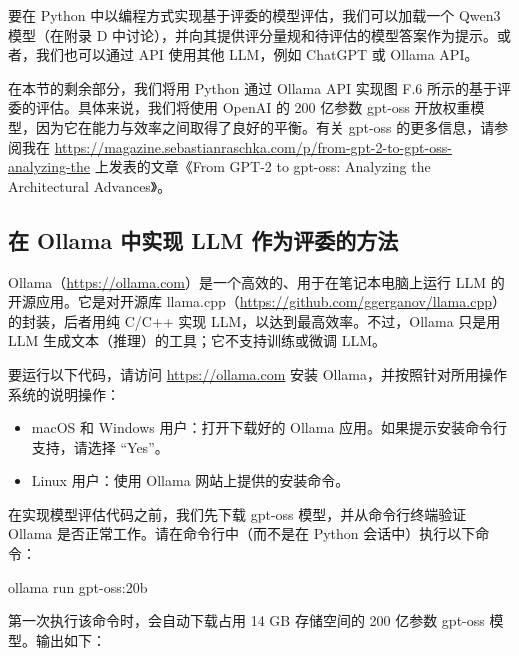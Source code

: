 要在 Python 中以编程方式实现基于评委的模型评估，我们可以加载一个 Qwen3 模型（在附录 D 中讨论），并向其提供评分量规和待评估的模型答案作为提示。或者，我们也可以通过 API 使用其他 LLM，例如 ChatGPT 或 Ollama API。

在本节的剩余部分，我们将用 Python 通过 Ollama API 实现图 F.6 所示的基于评委的评估。具体来说，我们将使用 OpenAI 的 200 亿参数 gpt-oss 开放权重模型，因为它在能力与效率之间取得了良好的平衡。有关 gpt-oss 的更多信息，请参阅我在 \href{https://magazine.sebastianraschka.com/p/from-gpt-2-to-gpt-oss-analyzing-the}{https://magazine.sebastianraschka.com/p/from-gpt-2-to-gpt-oss-analyzing-the} 上发表的文章《From GPT-2 to gpt-oss: Analyzing the Architectural Advances》。

\subsection{在 Ollama 中实现 LLM 作为评委的方法}

Ollama（\href{https://ollama.com}{https://ollama.com}）是一个高效的、用于在笔记本电脑上运行 LLM 的开源应用。它是对开源库 llama.cpp（\href{https://github.com/ggerganov/llama.cpp}{https://github.com/ggerganov/llama.cpp}）的封装，后者用纯 C/C++ 实现 LLM，以达到最高效率。不过，Ollama 只是用 LLM 生成文本（推理）的工具；它不支持训练或微调 LLM。

要运行以下代码，请访问 \href{https://ollama.com}{https://ollama.com} 安装 Ollama，并按照针对所用操作系统的说明操作：

\begin{itemize}
\item macOS 和 Windows 用户：打开下载好的 Ollama 应用。如果提示安装命令行支持，请选择 “Yes”。
\item Linux 用户：使用 Ollama 网站上提供的安装命令。
\end{itemize}

在实现模型评估代码之前，我们先下载 gpt-oss 模型，并从命令行终端验证 Ollama 是否正常工作。请在命令行中（而不是在 Python 会话中）执行以下命令：

\begin{codebox}
ollama run gpt-oss:20b
\end{codebox}

第一次执行该命令时，会自动下载占用 14 GB 存储空间的 200 亿参数 gpt-oss 模型。输出如下：


